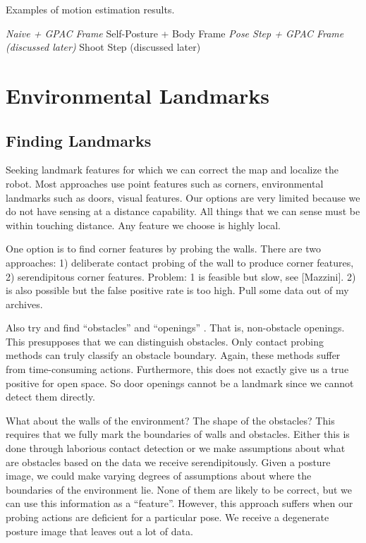 Examples of motion estimation results.

\emph{Naive + GPAC Frame
}Self-Posture + Body Frame
\emph{Pose Step + GPAC Frame (discussed later)
}Shoot Step (discussed later)

\pagebreak 

\chapter{Environmental Landmarks}
\label{environmentallandmarks}

\section{Finding Landmarks}
\label{findinglandmarks}

Seeking landmark features for which we can correct the map and localize the robot. Most approaches use point features such as corners, environmental landmarks such as doors, visual features. Our options are very limited because we do not have sensing at a distance capability. All things that we can sense must be within touching distance. Any feature we choose is highly local.

One option is to find corner features by probing the walls. There are two approaches: 1) deliberate contact probing of the wall to produce corner features, 2) serendipitous corner features. Problem: 1 is feasible but slow, see [Mazzini]. 2) is also possible but the false positive rate is too high. Pull some data out of my archives.

Also try and find “obstacles” and “openings” . That is, non-obstacle openings. This presupposes that we can distinguish obstacles. Only contact probing methods can truly classify an obstacle boundary. Again, these methods suffer from time-consuming actions. Furthermore, this does not exactly give us a true positive for open space. So door openings cannot be a landmark since we cannot detect them directly.

What about the walls of the environment? The shape of the obstacles? This requires that we fully mark the boundaries of walls and obstacles. Either this is done through laborious contact detection or we make assumptions about what are obstacles based on the data we receive serendipitously. Given a posture image, we could make varying degrees of assumptions about where the boundaries of the environment lie. None of them are likely to be correct, but we can use this information as a “feature”. However, this approach suffers when our probing actions are deficient for a particular pose. We receive a degenerate posture image that leaves out a lot of data. 

